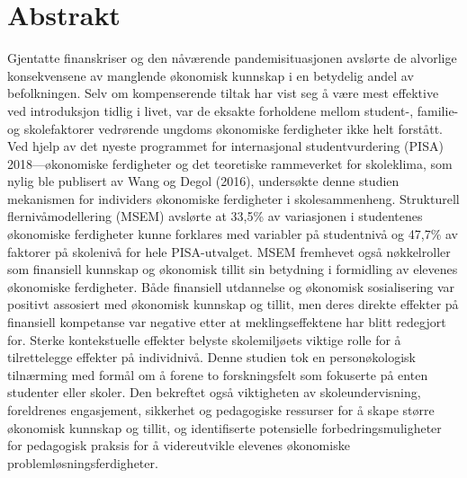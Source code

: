 \section*{Abstrakt}

\noinent Gjentatte finanskriser og den nåværende pandemisituasjonen avslørte de alvorlige konsekvensene av manglende økonomisk kunnskap i en betydelig andel av befolkningen. Selv om kompenserende tiltak har vist seg å være mest effektive ved introduksjon tidlig i livet, var de eksakte forholdene mellom student-, familie- og skolefaktorer vedrørende ungdoms økonomiske ferdigheter ikke helt forstått. Ved hjelp av det nyeste programmet for internasjonal studentvurdering (PISA) 2018---økonomiske ferdigheter og det teoretiske rammeverket for skoleklima, som nylig ble publisert av Wang og Degol (2016), undersøkte denne studien mekanismen for individers økonomiske ferdigheter i skolesammenheng. Strukturell flernivåmodellering (MSEM) avslørte at 33,5\% av variasjonen i studentenes økonomiske ferdigheter kunne forklares med variabler på studentnivå og 47,7\% av faktorer på skolenivå for hele PISA-utvalget. MSEM fremhevet også nøkkelroller som finansiell kunnskap og økonomisk tillit sin betydning i formidling av elevenes økonomiske ferdigheter. Både finansiell utdannelse og økonomisk sosialisering var positivt assosiert med økonomisk kunnskap og tillit, men deres direkte effekter på finansiell kompetanse var negative etter at meklingseffektene har blitt redegjort for. Sterke kontekstuelle effekter belyste skolemiljøets viktige rolle for å tilrettelegge effekter på individnivå. Denne studien tok en personøkologisk tilnærming med formål om å forene to forskningsfelt som fokuserte på enten studenter eller skoler. Den bekreftet også viktigheten av skoleundervisning, foreldrenes engasjement, sikkerhet og pedagogiske ressurser for å skape større økonomisk kunnskap og tillit, og identifiserte potensielle forbedringsmuligheter for pedagogisk praksis for å videreutvikle elevenes økonomiske problemløsningsferdigheter.

